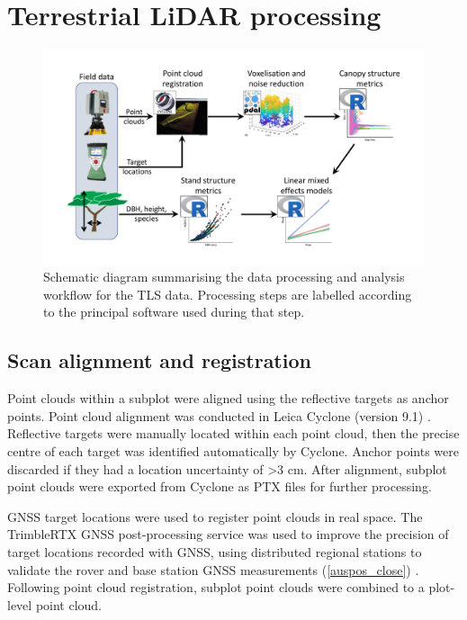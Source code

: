 \documentclass[11pt,a4paper]{article}
\begin{document}
\section{Terrestrial LiDAR processing}


\begin{figure}
\centering
	\includegraphics[width=\linewidth]{workflow_diag}
	\caption{Schematic diagram summarising the data processing and analysis workflow for the TLS data. Processing steps are labelled according to the principal software used during that step.}
	\label{workflow_diag}
\end{figure}

\subsection{Scan alignment and registration}

Point clouds within a subplot were aligned using the reflective targets as anchor points. Point cloud alignment was conducted in Leica Cyclone (version 9.1) \citep{Cyclone}. Reflective targets were manually located within each point cloud, then the precise centre of each target was identified automatically by Cyclone. Anchor points were discarded if they had a location uncertainty of >3 cm. After alignment, subplot point clouds were exported from Cyclone as PTX files for further processing.

GNSS target locations were used to register point clouds in real space. The TrimbleRTX GNSS post-processing service was used to improve the precision of target locations recorded with GNSS, using distributed regional stations to validate the rover and base station GNSS measurements (\autoref{auspos_close}) \citep{Chen2011}. Following point cloud registration, subplot point clouds were combined to a plot-level point cloud.
\end{document}
